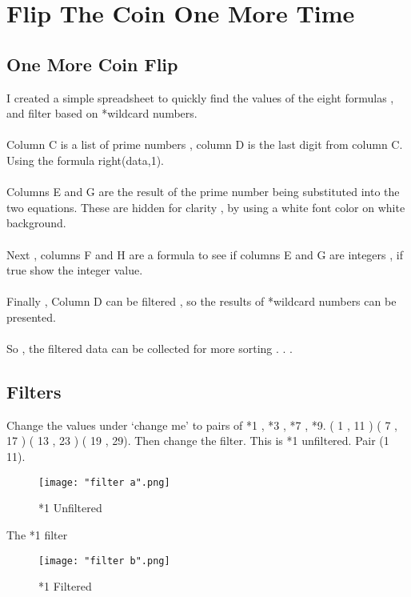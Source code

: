\section{Flip The Coin One More Time}
\normalfont
\normalsize
\subsection{One More Coin Flip}
I created a simple spreadsheet to quickly find the values of the eight formulas , and filter based on *wild\textendash card numbers.
\\
\\
Column C is a list of prime numbers , column D is the last digit from column C. Using the formula right(data,1).
\\
\\
Columns E and G are the result of the prime number being substituted into the two equations. These are hidden for clarity ,  by using a white font color on white background.
\\
\\
Next , columns F and H are a formula to see if columns E and G are integers , if true show the integer value.
\\
\\
Finally , Column D can be filtered , so the results of *wild\textendash card numbers can be presented.
\\
\\
So , the filtered data can be collected for more sorting  .  .  . 



\pagebreak 
\subsection{Filters}
\par 
Change the values under `change me'  to pairs of  *1 , *3 , *7 , *9. ( 1 , 11 ) ( 7 , 17 ) ( 13 , 23 ) ( 19 , 29). Then  change the filter. This is *1 unfiltered. Pair (1 11).
\begin{figure}[h]
    \centering
    \texttt{[image: "filter a".png]}
    \caption{*1 Unfiltered}
\end{figure}
\pagebreak

\par 
The *1 filter
\begin{figure}[h]
    \centering
    \texttt{[image: "filter b".png]}
    \caption{*1 Filtered}
\end{figure}
\pagebreak



